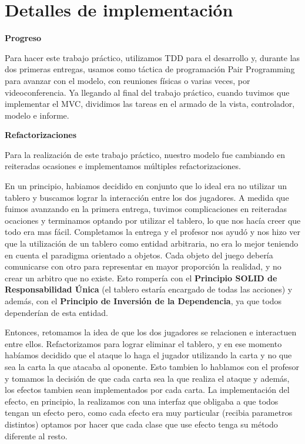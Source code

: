 \section{Detalles de implementación}


{\large\textbf{Progreso}}

\bigskip


Para hacer este trabajo práctico, utilizamos TDD para el desarrollo y, durante las dos primeras entregas, usamos como táctica de programación Pair Programming para avanzar con el modelo, con reuniones físicas o varias veces, por videoconferencia. Ya llegando al final del trabajo práctico, cuando tuvimos que implementar el MVC, dividimos las tareas en el armado de la vista, controlador, modelo e informe. 

\bigskip


{\large\textbf{Refactorizaciones}}

\bigskip

Para la realización de este trabajo práctico, nuestro modelo fue cambiando en reiteradas ocasiones e implementamos múltiples refactorizaciones. 

\medskip

En un principio, habiamos decidido en conjunto que lo ideal era no utilizar un tablero y buscamos lograr la interacción entre los dos jugadores. A medida que fuimos avanzando en la primera entrega, tuvimos complicaciones en reiteradas ocaciones y terminamos optando por utilizar el tablero, lo que nos hacía creer que todo era mas fácil. Completamos la entrega y el profesor nos ayudó y nos hizo ver que la utilización de un tablero como entidad arbitraria, no era lo mejor teniendo en cuenta el paradigma orientado a objetos. Cada objeto del juego debería comunicarse con otro para representar en mayor proporción la realidad, y no crear un arbitro que no existe. Esto rompería con el \textbf{Principio SOLID de Responsabilidad Única} (el tablero estaría encargado de todas las acciones) y además, con el \textbf{Principio de Inversión de la Dependencia}, ya que todos dependerían de esta entidad.

\medskip

Entonces, retomamos la idea de que los dos jugadores se relacionen e interactuen entre ellos. Refactorizamos para lograr eliminar el tablero, y en ese momento habíamos decidido que el ataque lo haga el jugador utilizando la carta y no que sea la carta la que atacaba al oponente. Esto tambien lo hablamos con el profesor y tomamos la decisión de que cada carta sea la que realiza el ataque y además, los efectos tambien sean implementados por cada carta. La implementación del efecto, en principio, la realizamos con una interfaz que obligaba a que todos tengan un efecto pero, como cada efecto era muy particular (recibia parametros distintos) optamos por hacer que cada clase que use efecto tenga su método diferente al resto.


